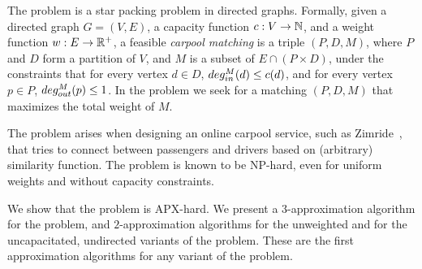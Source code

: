The \textsc{\CARPOOL{}} problem is a star packing problem in directed graphs.
Formally, given a directed graph $G = (V, E)$,
a capacity function $ c: V \rightarrow \mathbb{N} $,
and a weight function $w : E \rightarrow \mathbb{R^+} $,
a feasible \emph{carpool matching} is a triple 
$(P, D, M)$, where $P$ and $D$ form a partition of $V$, 
and $M$ is a subset of $E \cap (P \times D)$,
under the constraints that for every vertex $d \in D$, 
$deg^M_{in}(d) \leq c(d)$, 
and for every vertex $p \in P$, $deg^M_{out}(p) \leq 1$.
In the \textsc{\CARPOOL{}} problem we seek for a matching $(P, D, M)$ that maximizes the
total weight of $M$.

The problem arises when designing an online carpool service, 
such as Zimride~\cite{zimride}, 
that tries to connect between passengers and drivers based on (arbitrary) similarity function.
The problem is known to be NP-hard, 
even for uniform weights and without capacity constraints.

We show that the \textsc{\CARPOOL{}} problem is APX-hard. 
We present a $3$-approximation algorithm for the problem,
and $2$-approximation algorithms for the 
unweighted and for the uncapacitated, undirected variants of the problem.
These are the first approximation algorithms for any variant of the problem.
